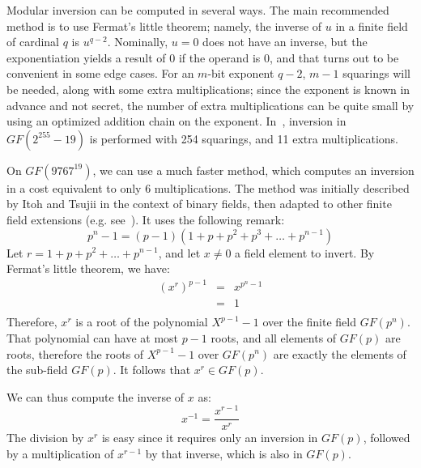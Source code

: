 \documentclass{llncs}
\newcommand{\GF}{GF}
\begin{document}
Modular inversion can be computed in several ways. The main recommended
method is to use Fermat's little theorem; namely, the inverse of $u$ in
a finite field of cardinal $q$ is $u^{q-2}$. Nominally, $u = 0$ does not
have an inverse, but the exponentiation yields a result of 0 if the
operand is 0, and that turns out to be convenient in some edge cases.
For an $m$-bit exponent $q-2$, $m-1$ squarings will be needed, along
with some extra multiplications; since the exponent is known in advance
and not secret, the number of extra multiplications can be quite small
by using an optimized addition chain on the exponent.
In~\cite{DulHaaHinHutPaaSanSch2015}, inversion in $\GF(2^{255}-19)$ is
performed with 254 squarings, and 11 extra multiplications.

On $\GF(9767^{19})$, we can use a much faster method, which computes an
inversion in a cost equivalent to only 6 multiplications. The method
was initially described by Itoh and Tsujii in the context of binary
fields\cite{ItoTsu1988}, then adapted to other finite field extensions
(e.g. see~\cite{HanMenVan2003}). It uses the following remark:
\begin{equation*}
    p^n - 1 = (p-1)(1 + p + p^2 + p^3 + \dots + p^{n-1})
\end{equation*}
Let $r = 1 + p + p^2 + \dots + p^{n-1}$, and let $x \neq 0$ a field
element to invert. By Fermat's little theorem, we have:
\begin{eqnarray*}
    (x^r)^{p-1} &=& x^{p^n-1} \\
                &=& 1 \\
\end{eqnarray*}
Therefore, $x^r$ is a root of the polynomial $X^{p-1}-1$ over the
finite field $\GF(p^n)$. That polynomial can have at most $p-1$ roots,
and all elements of $\GF(p)$ are roots, therefore the roots of
$X^{p-1}-1$ over $\GF(p^n)$ are exactly the elements of the sub-field
$\GF(p)$. It follows that $x^r \in \GF(p)$.

We can thus compute the inverse of $x$ as:
\begin{equation*}
    x^{-1} = \frac{x^{r-1}}{x^r}
\end{equation*}
The division by $x^r$ is easy since it requires only an inversion in
$\GF(p)$, followed by a multiplication of $x^{r-1}$ by that inverse,
which is also in $\GF(p)$.
\end{document}
